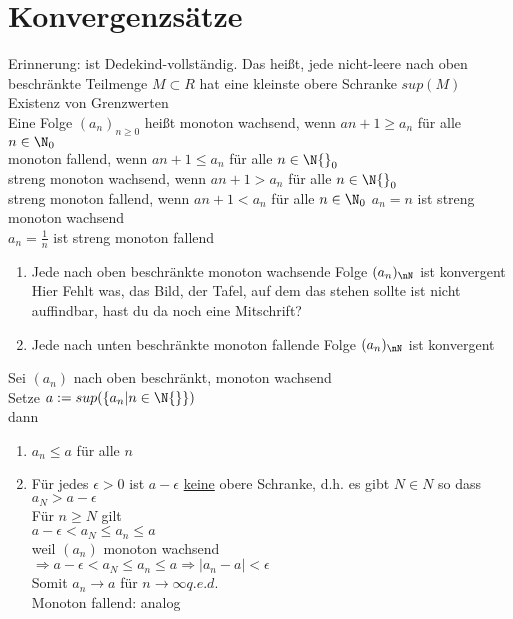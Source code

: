 \chapter{Konvergenzsätze}
Erinnerung: \R{} ist Dedekind-vollständig. Das heißt, jede nicht-leere nach oben beschränkte Teilmenge $M \subset R$ hat eine kleinste obere Schranke $sup(M)$\\
\phantom{XXX}\Rarr{} Existenz von Grenzwerten\\
Eine Folge $(a_n)_{n \geq 0}$ heißt monoton wachsend, wenn $a{n + 1} \geq a_n$ für alle $n \in \N_0$\\
monoton fallend, wenn $a{n + 1} \leq a_n$ für alle $n \in \N{}_0$\\
streng monoton wachsend, wenn $a{n + 1} > a_n$ für alle $n \in \N{}_0$\\
streng monoton fallend, wenn $a{n + 1} < a_n$ für alle $n \in \N_0$
\bsp
$a_n = n$ ist streng monoton wachsend\\
$a_n = \frac{1}{n}$ ist streng monoton fallend\\
\begin{enumerate}
\item{Jede nach oben beschränkte monoton wachsende Folge $(a_n)_{\nN}$ ist konvergent\\
Hier Fehlt was, das Bild, der Tafel, auf dem das stehen sollte ist nicht auffindbar, hast du da noch eine Mitschrift?
}
\item{Jede nach unten beschränkte monoton fallende Folge $(a_n)_\nN$ ist konvergent\\
}
\end{enumerate}
\bew
Sei $(a_n)$ nach oben beschränkt, monoton wachsend\\
Setze $a:= sup(\{a_n | n \in \N{}\})$\\
dann \begin{enumerate}
\item{$a_n \leq a$ für alle $n$}
\item{Für jedes $\epsilon > 0$ ist $a - \epsilon$ \underline{keine} obere Schranke, d.h. es gibt $N \in N$ so dass $a_N > a - \epsilon$
\\Für $n \geq N$ gilt\\
$a - \epsilon < a_N \leq a_n \leq a$\\
weil $(a_n)$ monoton wachsend\\
$\Rightarrow a - \epsilon < a_N \leq a_n \leq a \Rightarrow |a_n -a| < \epsilon$\\
Somit $a_n \to a$ für $n \to \infty$\phantom{XXX}$q.e.d.$\\
Monoton fallend: analog}
\end{enumerate}
